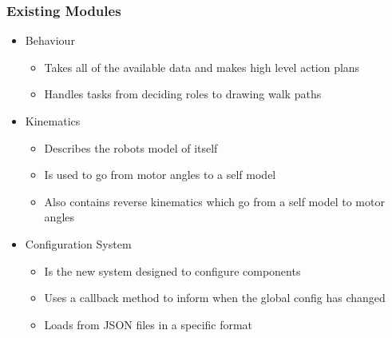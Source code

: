 \documentclass{beamer}
\begin{document}
\begin{frame}
    \frametitle{Existing Modules}
	\begin{itemize}
		\item Behaviour
			\begin{itemize}
				\item Takes all of the available data and makes high level action plans
				\item Handles tasks from deciding roles to drawing walk paths
			\end{itemize}
		\item Kinematics
			\begin{itemize}
				\item Describes the robots model of itself
				\item Is used to go from motor angles to a self model
				\item Also contains reverse kinematics which go from a self model to motor angles
			\end{itemize}
		\item Configuration System
			\begin{itemize}
				\item Is the new system designed to configure components
				\item Uses a callback method to inform when the global config has changed
				\item Loads from JSON files in a specific format
			\end{itemize}
	\end{itemize}
\end{frame}
\end{document}
